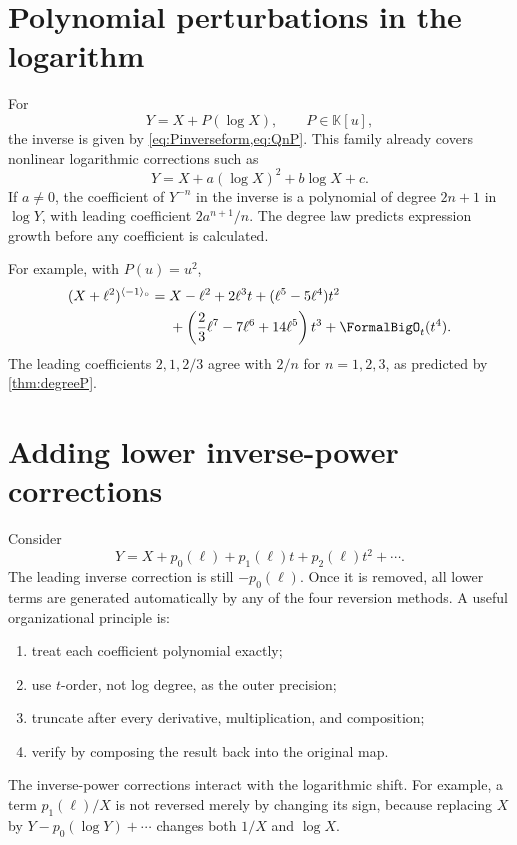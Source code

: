 \documentclass[11pt,oneside,openany]{book}
\newcommand{\K}{\mathbb{K}}
\newcommand{\rev}{^{\langle-1\rangle_{\circ}}}
\begin{document}
\section{Polynomial perturbations in the logarithm}
For
\[
 Y=X+P(\log X),
 \qquad P\in\K[u],
\]
the inverse is given by \cref{eq:Pinverseform,eq:QnP}.  This family already
covers nonlinear logarithmic corrections such as
\begin{equation}\label{eq:quadraticlogmap}
 Y=X+a(\log X)^2+b\log X+c.
\end{equation}
If \(a\neq0\), the coefficient of \(Y^{-n}\) in the inverse is a polynomial of
degree \(2n+1\) in \(\log Y\), with leading coefficient
\(2a^{n+1}/n\).  The degree law predicts expression growth before any
coefficient is calculated.

For example, with \(P(u)=u^2\),
\begin{align}
 (X+\ell^2)\rev
 ={}&X-\ell^2+2\ell^3t
 +(\ell^5-5\ell^4)t^2\notag\\
 &+\left(\frac23\ell^7-7\ell^6+14\ell^5\right)t^3
 +\FormalBigO_t(t^4).
 \label{eq:quadraticloginverse}
\end{align}
The leading coefficients \(2,1,2/3\) agree with
\(2/n\) for \(n=1,2,3\), as predicted by \cref{thm:degreeP}.

\section{Adding lower inverse-power corrections}
Consider
\begin{equation}\label{eq:generalphiwithpowers}
 Y=X+p_0(\ell)+p_1(\ell)t+p_2(\ell)t^2+\cdots.
\end{equation}
The leading inverse correction is still \(-p_0(\ell)\).  Once it is removed,
all lower terms are generated automatically by any of the four reversion
methods.  A useful organizational principle is:

\begin{enumerate}
\item treat each coefficient polynomial exactly;
\item use \(t\)-order, not log degree, as the outer precision;
\item truncate after every derivative, multiplication, and composition;
\item verify by composing the result back into the original map.
\end{enumerate}

The inverse-power corrections interact with the logarithmic shift.  For
example, a term \(p_1(\ell)/X\) is not reversed merely by changing its sign,
because replacing \(X\) by \(Y-p_0(\log Y)+\cdots\) changes both \(1/X\) and
\(\log X\).
\end{document}
